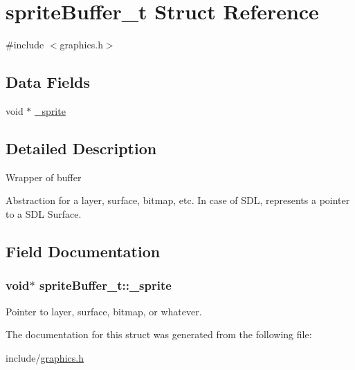 \hypertarget{structsprite_buffer__t}{}\section{sprite\+Buffer\+\_\+t Struct Reference}
\label{structsprite_buffer__t}


{\ttfamily \#include $<$graphics.\+h$>$}

\subsection*{Data Fields}
\begin{DoxyCompactItemize}
\item 
void $\ast$ \hyperlink{structsprite_buffer__t_a4714aead824e3ab1026dbbbe1f996cb9}{\+\_\+sprite}
\end{DoxyCompactItemize}


\subsection{Detailed Description}
Wrapper of buffer

Abstraction for a layer, surface, bitmap, etc. In case of S\+DL, represents a pointer to a S\+DL Surface. 

\subsection{Field Documentation}
\subsubsection[{\texorpdfstring{\+\_\+sprite}{\_sprite}}]{\setlength{\rightskip}{0pt plus 5cm}void$\ast$ sprite\+Buffer\+\_\+t\+::\+\_\+sprite}\hypertarget{structsprite_buffer__t_a4714aead824e3ab1026dbbbe1f996cb9}{}\label{structsprite_buffer__t_a4714aead824e3ab1026dbbbe1f996cb9}
Pointer to layer, surface, bitmap, or whatever. 

The documentation for this struct was generated from the following file\+:\begin{DoxyCompactItemize}
\item 
include/\hyperlink{graphics_8h}{graphics.\+h}\end{DoxyCompactItemize}
